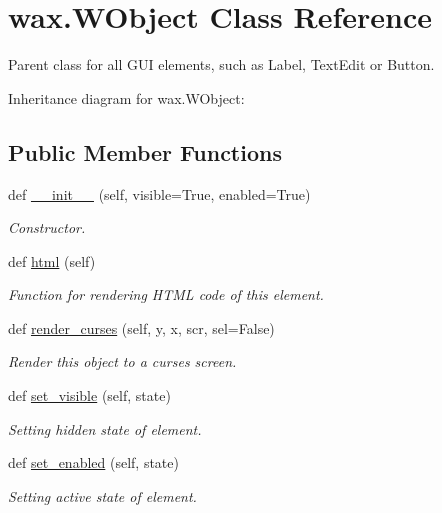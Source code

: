 \hypertarget{classwax_1_1WObject}{}\section{wax.\+W\+Object Class Reference}
\label{classwax_1_1WObject}


Parent class for all G\+UI elements, such as Label, Text\+Edit or Button.  




Inheritance diagram for wax.\+W\+Object\+:
\subsection*{Public Member Functions}
\begin{DoxyCompactItemize}
\item 
def \hyperlink{classwax_1_1WObject_a47041eb6776f954ff5a380583c183651}{\+\_\+\+\_\+init\+\_\+\+\_\+} (self, visible=True, enabled=True)
\begin{DoxyCompactList}\small\item\em Constructor. \end{DoxyCompactList}\item 
def \hyperlink{classwax_1_1WObject_a55fcacc733b25ca002ce8c7a2e929f6e}{html} (self)
\begin{DoxyCompactList}\small\item\em Function for rendering H\+T\+ML code of this element. \end{DoxyCompactList}\item 
def \hyperlink{classwax_1_1WObject_a31f1bd94ebc9de98e0621e70f912b088}{render\+\_\+curses} (self, y, x, scr, sel=False)
\begin{DoxyCompactList}\small\item\em Render this object to a curses screen. \end{DoxyCompactList}\item 
def \hyperlink{classwax_1_1WObject_a98bb0b956f5eb1a3582028632a271d06}{set\+\_\+visible} (self, state)
\begin{DoxyCompactList}\small\item\em Setting hidden state of element. \end{DoxyCompactList}\item 
def \hyperlink{classwax_1_1WObject_ace86bad06af0382e6957061d69586e07}{set\+\_\+enabled} (self, state)
\begin{DoxyCompactList}\small\item\em Setting active state of element. \end{DoxyCompactList}\end{DoxyCompactItemize}


